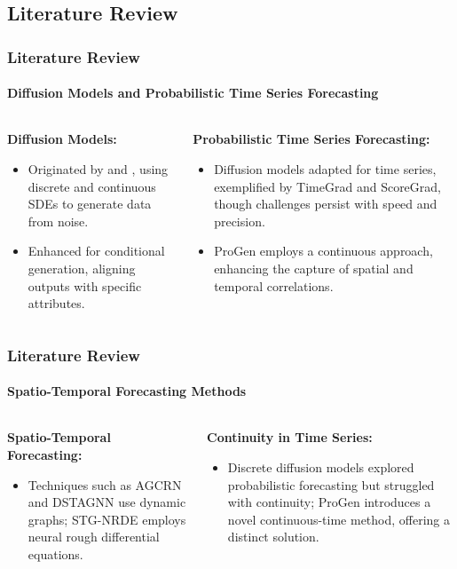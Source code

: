 \documentclass[light]{lutbeamer} %
\begin{document}
\subsection{Literature Review}
\begin{frame}
    \frametitle{Literature Review}
    \framesubtitle{Diffusion Models and Probabilistic Time Series Forecasting}

    \begin{columns}[T]
        \begin{column}{0.48\textwidth}
            \textbf{Diffusion Models:}
            \begin{itemize}
                \item Originated by \citet{ho2020} and \citet{song2021}, using discrete and continuous SDEs to generate data from noise.
                \item Enhanced for conditional generation, aligning outputs with specific attributes.
            \end{itemize}
        \end{column}
        \begin{column}{0.48\textwidth}
            \textbf{Probabilistic Time Series Forecasting:}
            \begin{itemize}
                \item Diffusion models adapted for time series, exemplified by TimeGrad and ScoreGrad, though challenges persist with speed and precision.
                \item ProGen employs a continuous approach, enhancing the capture of spatial and temporal correlations.
            \end{itemize}
        \end{column}
    \end{columns}
\end{frame}

\begin{frame}
    \frametitle{Literature Review}
    \framesubtitle{Spatio-Temporal Forecasting Methods}

    \begin{columns}[T]
        \begin{column}{0.48\textwidth}
            \textbf{Spatio-Temporal Forecasting:}
            \begin{itemize}
                \item Techniques such as AGCRN and DSTAGNN use dynamic graphs; STG-NRDE employs neural rough differential equations.
            \end{itemize}
        \end{column}
        \begin{column}{0.48\textwidth}
            \textbf{Continuity in Time Series:}
            \begin{itemize}
                \item Discrete diffusion models explored probabilistic forecasting but struggled with continuity; ProGen introduces a novel continuous-time method, offering a distinct solution.
            \end{itemize}
        \end{column}
    \end{columns}
\end{frame}
\end{document}
